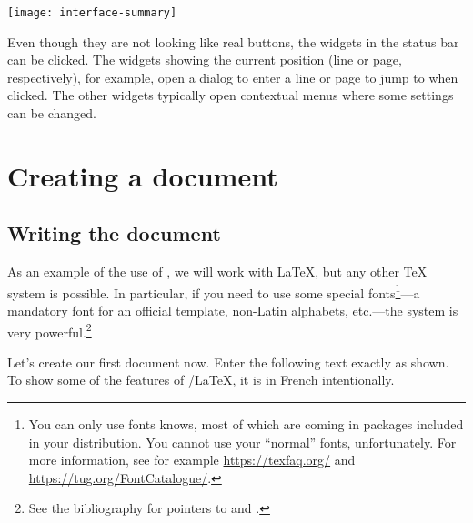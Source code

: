 \begin{center}
\texttt{[image: interface-summary]}
\end{center}

Even though they are not looking like real buttons, the widgets in the status bar can be clicked. The widgets showing the current position (line or page, respectively), for example, open a dialog to enter a line or page to jump to when clicked. The other widgets typically open contextual menus where some settings can be changed.

\section{Creating a document}

\subsection{Writing the document}

As an example of the use of {\Tw}, we will work with \LaTeX{}, but any other {\TeX} system is possible. In particular, if you need to use some special fonts\footnote{You can only use fonts {\AllTeX} knows, most of which are coming in packages included in your distribution. You cannot use your ``normal'' fonts, unfortunately. For more information, see for example \url{https://texfaq.org/} and \url{https://tug.org/FontCatalogue/}.}---a mandatory font for an official template, non-Latin alphabets, etc.---the {\XeTeX} system is very powerful.\footnote{See the bibliography for pointers to {\XeTeX} and \XeLaTeX.}

Let's create our first document now. Enter the following text exactly as shown. To show some of the features of {\Tw}/{\LaTeX}, it is in French intentionally.


